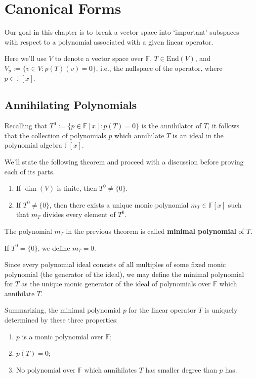 \chapter{Canonical Forms}

Our goal in this chapter is to break a vector space into `important' subspaces with respect to a polynomial associated with a given linear operator.

Here we'll use $V$ to denote a vector space over $\mathbb{F}$, $T \in \text{End}(V)$, and $V_p := \{ v \in V : p(T)(v) = 0 \}$, i.e., the nullspace of the operator, where $p \in \mathbb{F}[x]$.

\section{Annihilating Polynomials}

Recalling that $T^0 := \{ p \in \mathbb{F}[x] : p(T) = 0 \}$ is the annihilator of $T$, it follows that the collection of polynomials $p$ which annihilate $T$ is an \hyperref[def:ideal]{ideal} in the polynomial algebra $\mathbb{F}[x]$.

We'll state the following theorem and proceed with a discussion before proving each of its parts.

\begin{theorem}\label{thm:minimal-polynomial} \hfill
	\begin{enumerate}
		\item If $\dim (V)$ is finite, then $T^0 \neq \{ 0 \}$.
		\item If $T^0 \neq \{ 0 \}$, then there exists a unique monic polynomial $m_T \in \mathbb{F}[x]$ such that $m_T$ divides every element of $T^0$.
	\end{enumerate}
\end{theorem}

\begin{definition}
	The polynomial $m_T$ in the previous theorem is called \textbf{minimal polynomial} of $T$.
	
	If $T^0 = \{ 0 \}$, we define $m_T = 0$.
\end{definition}

Since every polynomial ideal consists of all multiples of some fixed monic polynomial (the generator of the ideal), we may define the minimal polynomial for $T$ as the unique monic generator of the ideal of polynomials over $\mathbb{F}$ which annihilate $T$.

Summarizing, the minimal polynomial $p$ for the linear operator $T$ is uniquely determined by these three properties:
\begin{enumerate}
	\item $p$ is a monic polynomial over $\mathbb{F}$;
	\item $p(T) = 0$;
	\item No polynomial over $\mathbb{F}$ which annihilates $T$ has smaller degree than $p$ has.
\end{enumerate}

